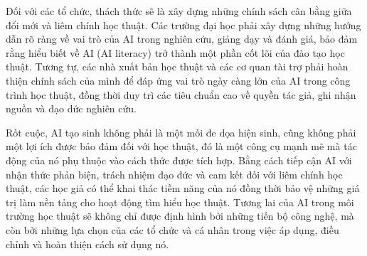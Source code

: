 Đối với các tổ chức, thách thức sẽ là xây dựng những chính sách cân bằng giữa đổi mới và liêm chính học thuật. Các trường đại học phải xây dựng những hướng dẫn rõ ràng về vai trò của AI trong nghiên cứu, giảng dạy và đánh giá, bảo đảm rằng hiểu biết về AI (AI literacy) trở thành một phần cốt lõi của đào tạo học thuật. Tương tự, các nhà xuất bản học thuật và các cơ quan tài trợ phải hoàn thiện chính sách của mình để đáp ứng vai trò ngày càng lớn của AI trong công trình học thuật, đồng thời duy trì các tiêu chuẩn cao về quyền tác giả, ghi nhận nguồn và đạo đức nghiên cứu.

Rốt cuộc, AI tạo sinh không phải là một mối đe dọa hiện sinh, cũng không phải một lợi ích được bảo đảm đối với học thuật, đó là một công cụ mạnh mẽ mà tác động của nó phụ thuộc vào cách thức được tích hợp. Bằng cách tiếp cận AI với nhận thức phản biện, trách nhiệm đạo đức và cam kết đối với liêm chính học thuật, các học giả có thể khai thác tiềm năng của nó đồng thời bảo vệ những giá trị làm nền tảng cho hoạt động tìm hiểu học thuật. Tương lai của AI trong môi trường học thuật sẽ không chỉ được định hình bởi những tiến bộ công nghệ, mà còn bởi những lựa chọn của các tổ chức và cá nhân trong việc áp dụng, điều chỉnh và hoàn thiện cách sử dụng nó.
